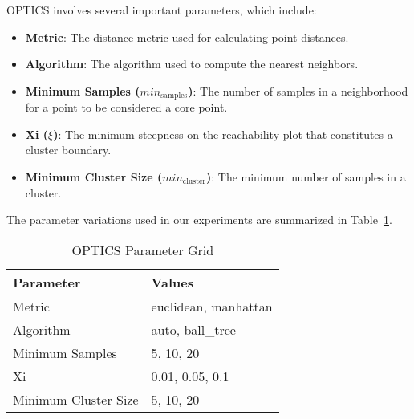 OPTICS involves several important parameters, which include:

\begin{itemize}
    \item \textbf{Metric}: The distance metric used for calculating point distances.
    \item \textbf{Algorithm}: The algorithm used to compute the nearest neighbors.
    \item \textbf{Minimum Samples (\(min_{\text{samples}}\))}: The number of samples in a neighborhood for a point to be considered a core point.
    \item \textbf{Xi (\(\xi\))}: The minimum steepness on the reachability plot that constitutes a cluster boundary.
    \item \textbf{Minimum Cluster Size (\(min_{\text{cluster}}\))}: The minimum number of samples in a cluster.
\end{itemize}

The parameter variations used in our experiments are summarized in Table~\ref{tab:optics-param-grid}.

\begin{table}[ht]
\centering
\caption{OPTICS Parameter Grid}
\label{tab:optics-param-grid}
\begin{tabularx}{\columnwidth}{|X|X|}
\hline
\textbf{Parameter} & \textbf{Values} \\ \hline
Metric & euclidean, manhattan \\ \hline
Algorithm & auto, ball\_tree \\ \hline
Minimum Samples & 5, 10, 20 \\ \hline
Xi & 0.01, 0.05, 0.1 \\ \hline
Minimum Cluster Size & 5, 10, 20 \\ \hline
\end{tabularx}
\end{table}
